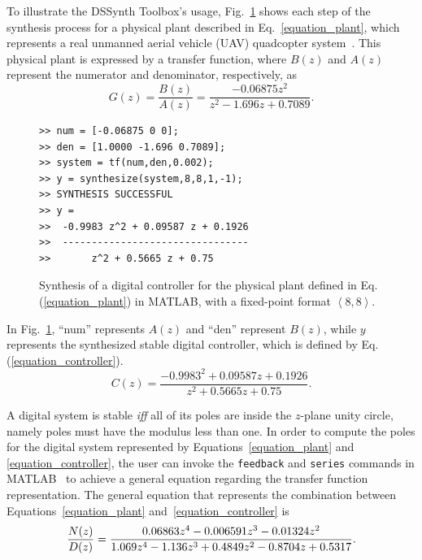 \documentclass[10pt,conference]{IEEEtran}
\newcommand\tool{{DSSynth Toolbox}\xspace}
\begin{document}
To illustrate the \tool's usage, Fig.~\ref{toolbox-usage} shows each step of the 
synthesis process for a physical plant described in Eq.~\eqref{equation_plant},
which represents a real unmanned aerial vehicle (UAV) quadcopter system~\cite{bouabdallah}. 
This physical plant is expressed by a transfer function, where 
$B(z)$ and $A(z)$ represent the numerator and denominator, respectively, as
%
\begin{equation}
\label{equation_plant}
G(z)=\frac{B(z)}{A(z)}=\frac{-0.06875z^{2}}{z^2-1.696z+0.7089}.
\end{equation}

\begin{figure}[ht]
\scriptsize
\begin{lstlisting}[xleftmargin=.025\textwidth,xrightmargin=.025\textwidth, frame=single,]
>> num = [-0.06875 0 0];
>> den = [1.0000 -1.696 0.7089];
>> system = tf(num,den,0.002);
>> y = synthesize(system,8,8,1,-1);
>> SYNTHESIS SUCCESSFUL
>> y = 
>>  -0.9983 z^2 + 0.09587 z + 0.1926
>>  --------------------------------
>>       z^2 + 0.5665 z + 0.75
\end{lstlisting}
\vspace{-0.2cm}
\caption{Synthesis of a digital controller for the physical plant defined in Eq.(\ref{equation_plant}) in MATLAB, with a fixed-point format  $\left\langle 8,8\right\rangle$.}
\label{toolbox-usage}
\end{figure}

In Fig.~\ref{toolbox-usage}, ``num'' represents $A(z)$ and ``den'' represent $B(z)$, while 
$y$ represents the synthesized stable digital controller, which is defined by Eq.(\ref{equation_controller}).
%
\begin{equation}
\label{equation_controller}
C(z)=\frac{-0.9983^{2}+0.09587z+0.1926}{z^2+0.5665z+0.75}.
\end{equation}

A digital system is stable \textit{iff} all of its poles are inside the $z$-plane unity circle, 
namely poles must have the modulus less than one. In order to compute the poles for the digital 
system represented by Equations~\eqref{equation_plant} and \eqref{equation_controller}, 
the user can invoke the \texttt{feedback} and \texttt{series} commands in MATLAB~\cite{matlab-toolbox} 
to achieve a general equation regarding the transfer function representation. 
The general equation that represents the combination between Equations~\eqref{equation_plant}
and~\eqref{equation_controller} is
%
\begin{equation}
\small
\label{equation_general}
\frac{N(z)}{D(z)}=\frac{0.06863z^{4} - 0.006591z^{3} - 0.01324z^{2}}{1.069z^{4} - 1.136z^{3} + 0.4849z^{2} -0.8704z + 0.5317}.
\end{equation}
 
\end{document}
